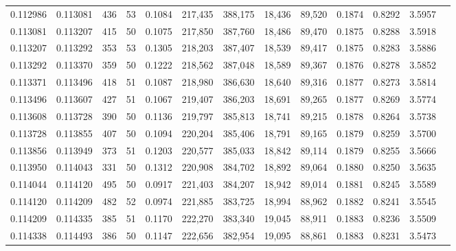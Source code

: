 \begin{tabular}{rrrrrrrrrrrrr}
0.112986 & 0.113081 &   436 &  53 &                                     0.1084 & 217,435 & 388,175 &  18,436 &  89,520 & 0.1874 & 0.8292 & 3.5957 \\
0.113081 & 0.113207 &   415 &  50 &                                     0.1075 & 217,850 & 387,760 &  18,486 &  89,470 & 0.1875 & 0.8288 & 3.5918 \\
0.113207 & 0.113292 &   353 &  53 &                                     0.1305 & 218,203 & 387,407 &  18,539 &  89,417 & 0.1875 & 0.8283 & 3.5886 \\
0.113292 & 0.113370 &   359 &  50 &                                     0.1222 & 218,562 & 387,048 &  18,589 &  89,367 & 0.1876 & 0.8278 & 3.5852 \\
0.113371 & 0.113496 &   418 &  51 &                                     0.1087 & 218,980 & 386,630 &  18,640 &  89,316 & 0.1877 & 0.8273 & 3.5814 \\
0.113496 & 0.113607 &   427 &  51 &                                     0.1067 & 219,407 & 386,203 &  18,691 &  89,265 & 0.1877 & 0.8269 & 3.5774 \\
0.113608 & 0.113728 &   390 &  50 &                                     0.1136 & 219,797 & 385,813 &  18,741 &  89,215 & 0.1878 & 0.8264 & 3.5738 \\
0.113728 & 0.113855 &   407 &  50 &                                     0.1094 & 220,204 & 385,406 &  18,791 &  89,165 & 0.1879 & 0.8259 & 3.5700 \\
0.113856 & 0.113949 &   373 &  51 &                                     0.1203 & 220,577 & 385,033 &  18,842 &  89,114 & 0.1879 & 0.8255 & 3.5666 \\
0.113950 & 0.114043 &   331 &  50 &                                     0.1312 & 220,908 & 384,702 &  18,892 &  89,064 & 0.1880 & 0.8250 & 3.5635 \\
0.114044 & 0.114120 &   495 &  50 &                                     0.0917 & 221,403 & 384,207 &  18,942 &  89,014 & 0.1881 & 0.8245 & 3.5589 \\
0.114120 & 0.114209 &   482 &  52 &                                     0.0974 & 221,885 & 383,725 &  18,994 &  88,962 & 0.1882 & 0.8241 & 3.5545 \\
0.114209 & 0.114335 &   385 &  51 &                                     0.1170 & 222,270 & 383,340 &  19,045 &  88,911 & 0.1883 & 0.8236 & 3.5509 \\
0.114338 & 0.114493 &   386 &  50 &                                     0.1147 & 222,656 & 382,954 &  19,095 &  88,861 & 0.1883 & 0.8231 & 3.5473 \\

\end{tabular}

